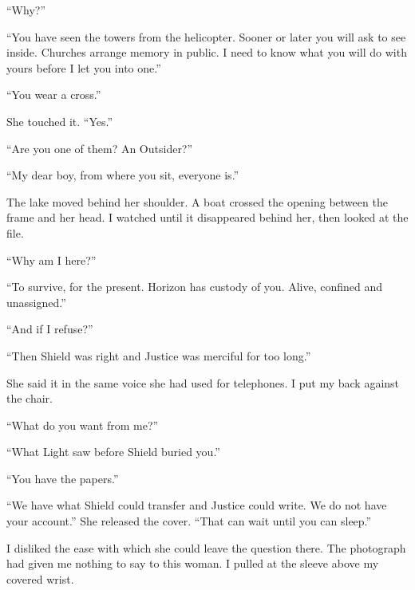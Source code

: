 ``Why?''\par

``You have seen the towers from the helicopter. Sooner or later you will ask to see inside. Churches arrange memory in public. I need to know what you will do with yours before I let you into one.''\par

``You wear a cross.''\par

She touched it. ``Yes.''\par

``Are you one of them? An Outsider?''\par

``My dear boy, from where you sit, everyone is.''\par

The lake moved behind her shoulder. A boat crossed the opening between the frame and her head. I watched until it disappeared behind her, then looked at the file.\par

``Why am I here?''\par

``To survive, for the present. Horizon has custody of you. Alive, confined and unassigned.''\par

``And if I refuse?''\par

``Then Shield was right and Justice was merciful for too long.''\par

She said it in the same voice she had used for telephones. I put my back against the chair.\par

``What do you want from me?''\par

``What Light saw before Shield buried you.''\par

``You have the papers.''\par

``We have what Shield could transfer and Justice could write. We do not have your account.'' She released the cover. ``That can wait until you can sleep.''\par

I disliked the ease with which she could leave the question there. The photograph had given me nothing to say to this woman. I pulled at the sleeve above my covered wrist.\par

